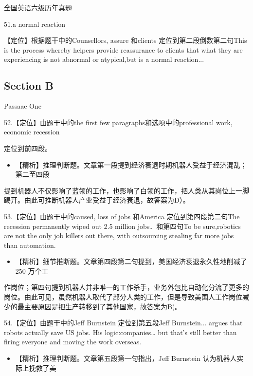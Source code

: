 \documentclass[UTF8,11pt]{ctexart}
\begin{document}
全国英语六级历年真题


51.a normal reaction


【定位】根据题干中的Counsellors, assure 和clients 定位到第二段倒数第二句This is the process whereby helpers provide reassurance to clients that what they are experiencing is not abnormal or atypical,but is a normal reaction...


\subsection*{\textbf{Section B}}


Passaae One


52.【定位】由题干中的the first few paragraphs和选项中的professional work, economic recession


定位到前四段。


\begin{itemize}[leftmargin=2em,itemsep=.2em,topsep=.4em]\item[D.] 【精析】推理判断题。文章第一段提到经济衰退时期机器人受益于经济混乱；第二至四段
\end{itemize}

提到机器人不仅影响了蓝领的工作，也影响了白领的工作，把人类从其岗位上一脚踢开。由此可推断机器人产业受益于经济衰退，故答案为D）。


53.【定位】由题干中的caused, loss of jobs 和America 定位到第四段第二句The recession permanently wiped out 2.5 million jobs．和第四句To be sure,robotics are not the only job killers out there, with outsourcing stealing far more jobs than automation.


\begin{itemize}[leftmargin=2em,itemsep=.2em,topsep=.4em]\item[B.] 【精析】细节推断题。文章第四段第二句提到，美国经济衰退永久性地削减了250 万个工
\end{itemize}

作岗位；第四句提到机器人并非唯一的工作杀手，业务外包比自动化分流了更多的岗位。由此可见，虽然机器人取代了部分人类的工作，但是导致美国人工作岗位减少的最主要原因是把生产转移到了其他国家，故答案为B)。


54.【定位】由题干中的Jeff Burnstein 定位到第五段Jeff Burnstein... argues that robots actually save US jobs. His logic:companies… but that's still better than firing everyone and moving the work overseas.


\begin{itemize}[leftmargin=2em,itemsep=.2em,topsep=.4em]\item[C.] 【精析】推理判断题。文章第五段第一句指出，Jeff Burnstein 认为机器人实际上挽救了美
\end{itemize}
\end{document}
